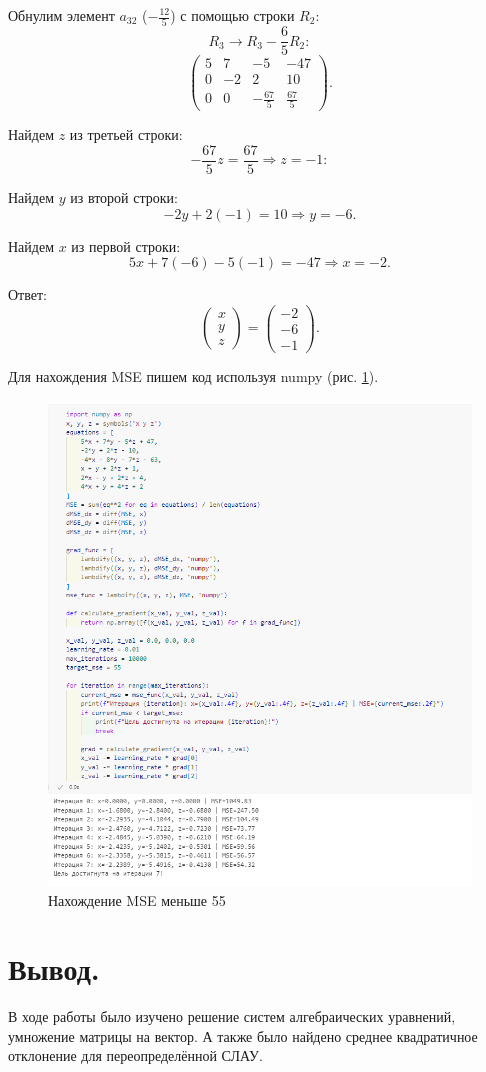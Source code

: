 \documentclass[14pt,a4paper]{extarticle}
\begin{document}
Обнулим элемент $a_{32}$ ($-\frac{12}{5}$) с помощью строки $R_2$:
\[
R_3 \rightarrow R_3 - \frac{6}{5}R_2
:\]
\[
\left(\begin{array}{ccc|c}
5 & 7 & -5 & -47 \\
0 & -2 & 2 & 10 \\
0 & 0 & -\frac{67}{5} & \frac{67}{5}
\end{array}\right)
.\]

Найдем $z$ из третьей строки:
\[
-\frac{67}{5}z = \frac{67}{5} \Rightarrow z = -1
:\]

Найдем $y$ из второй строки:
\[
-2y + 2(-1) = 10 \Rightarrow y = -6.
\]

Найдем $x$ из первой строки:
\[
5x + 7(-6) - 5(-1) = -47 \Rightarrow x = -2.
\]

Ответ:
\[{
\begin{pmatrix}
x \\
y \\
z
\end{pmatrix}
=
\begin{pmatrix}
-2 \\
-6 \\
-1
\end{pmatrix}
}
.\]

Для нахождения MSE пишем код используя numpy (рис. \ref{pic:mse}).

\begin{figure}[h!]
    \centering
    \includegraphics[scale=0.7]{pic8/3.png}
    \caption{Нахождение MSE меньше 55}
    \label{pic:mse}
\end{figure}
\FloatBarrier
\section*{Вывод.}

В ходе работы было изучено решение систем алгебраических уравнений, умножение матрицы на вектор.
А также было найдено среднее квадратичное отклонение для переопределённой СЛАУ.
\end{document}

